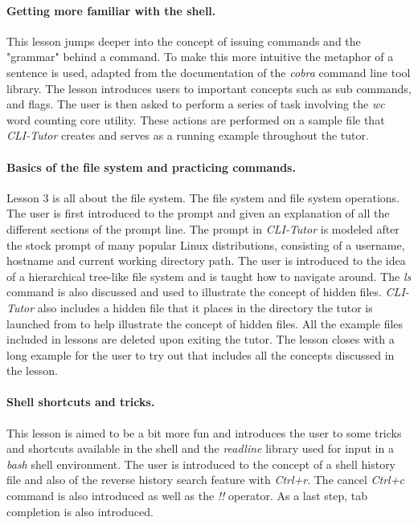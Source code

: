 \paragraph{Getting more familiar with the shell.} This lesson jumps deeper into
the concept of issuing commands and the "grammar" behind a command. To make
this more intuitive the metaphor of a sentence is used, adapted from the
documentation of the \textit{cobra} command line tool
library\cite{franciacobra}. The lesson introduces users to important concepts
such as sub commands, and flags. The user is then asked to perform a series of
task involving the \textit{wc} word counting core utility. These actions are
performed on a sample file that \textit{CLI-Tutor} creates and serves as a
running example throughout the tutor.

\paragraph{Basics of the file system and practicing commands.} Lesson 3 is all
about the file system. The file system and file system operations. The user is
first introduced to the prompt and given an explanation of all the different
sections of the prompt line. The prompt in \textit{CLI-Tutor} is modeled after
the stock prompt of many popular Linux distributions, consisting of a username,
hostname and current working directory path. The user is introduced to the idea
of a hierarchical tree-like file system and is taught how to navigate around.
The \textit{ls} command is also discussed and used to illustrate the concept of
hidden files. \textit{CLI-Tutor} also includes a hidden file that it places in
the directory the tutor is launched from to help illustrate the concept of
hidden files. All the example files included in lessons are deleted upon
exiting the tutor. The lesson closes with a long example for the user to try
out that includes all the concepts discussed in the lesson.

\paragraph{Shell shortcuts and tricks.} This lesson is aimed to be a bit more
fun and introduces the user to some tricks and shortcuts available in the shell
and the \textit{readline}\cite{ramey_fox_readline} library used for input in a
\textit{bash} shell environment. The user is introduced to the concept of a
shell history file and also of the reverse history search feature with
\textit{Ctrl+r}. The cancel \textit{Ctrl+c} command is also introduced as well
as the \textit{!!} operator. As a last step, tab completion is also introduced.

